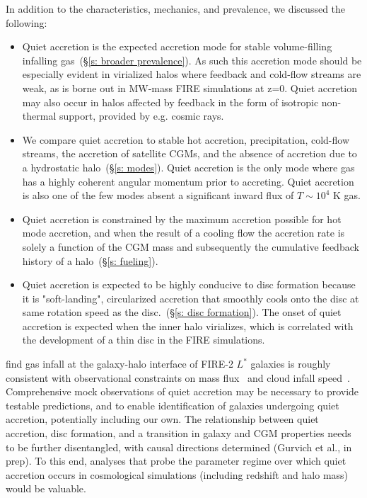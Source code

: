 \documentclass[fleqn,usenatbib]{mnras}
\begin{document}
In addition to the characteristics, mechanics, and prevalence, we discussed the following:
\begin{itemize}
    \item Quiet accretion is the expected accretion mode for stable volume-filling infalling gas~(\S\ref{s: broader prevalence}).
    As such this accretion mode should be especially evident in virialized halos where feedback and cold-flow streams are weak, as is borne out in MW-mass FIRE simulations at z=0.
    Quiet accretion may also occur in halos affected by feedback in the form of isotropic non-thermal support, provided by e.g. cosmic rays.
    \item We compare quiet accretion to stable hot accretion, precipitation, cold-flow streams, the accretion of satellite CGMs, and the absence of accretion due to a hydrostatic halo~(\S\ref{s: modes}).
    Quiet accretion is the only mode where gas has a highly coherent angular momentum prior to accreting.
    Quiet accretion is also one of the few modes absent a significant inward flux of $T\sim 10^4$ K gas.
    \item Quiet accretion is constrained by the maximum accretion possible for hot mode accretion, and when the result of a cooling flow the accretion rate is solely a function of the CGM mass and subsequently the cumulative feedback history of a halo~(\S\ref{s: fueling}).
    \item Quiet accretion is expected to be highly conducive to disc formation because it is "soft-landing", circularized accretion that smoothly cools onto the disc at same rotation speed as the disc.~(\S\ref{s: disc formation}).
    The onset of quiet accretion is expected when the inner halo virializes, which is correlated with the development of a thin disc in the FIRE simulations.
\end{itemize}

\cite{Trapp2021} find gas infall at the galaxy-halo interface of FIRE-2 $L^*$ galaxies is roughly consistent with observational constraints on mass flux~\citep[e.g.][]{Putman2012, Rohser2016} and cloud infall speed~\citep[e.g.][]{Zheng2017, Werk2019, Bish2019, Ho2020}.
Comprehensive mock observations of quiet accretion may be necessary to provide testable predictions, and to enable identification of galaxies undergoing quiet accretion, potentially including our own.
The relationship between quiet accretion, disc formation, and a transition in galaxy and CGM properties needs to be further disentangled, with causal directions determined (Gurvich et al., in prep).
To this end, analyses that probe the parameter regime over which quiet accretion occurs in cosmological simulations (including redshift and halo mass) would be valuable.
\end{document}
